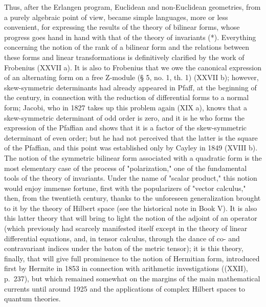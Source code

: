 Thus, after the Erlangen program, Euclidean and non-Euclidean geometries, from a purely algebraic point of view, became simple languages, more or less convenient, for expressing the results of the theory of bilinear forms, whose progress goes hand in hand with that of the theory of invariants (*). Everything concerning the notion of the rank of a bilinear form and the relations between these forms and linear transformations is definitively clarified by the work of Frobenius (XXVII a). It is also to Frobenius that we owe the canonical expression of an alternating form on a free Z-module (§ 5, no. 1, th. 1) (XXVII b); however, skew-symmetric determinants had already appeared in Pfaff, at the beginning of the century, in connection with the reduction of differential forms to a normal form; Jacobi, who in 1827 takes up this problem again (XIX a), knows that a skew-symmetric determinant of odd order is zero, and it is he who forms the expression of the Pfaffian and shows that it is a factor of the skew-symmetric determinant of even order; but he had not perceived that the latter is the square of the Pfaffian, and this point was established only by Cayley in 1849 (XVIII b). The notion of the symmetric bilinear form associated with a quadratic form is the most elementary case of the process of "polarization," one of the fundamental tools of the theory of invariants. Under the name of "scalar product," this notion would enjoy immense fortune, first with the popularizers of "vector calculus," then, from the twentieth century, thanks to the unforeseen generalization brought to it by the theory of Hilbert space (see the historical note in Book V). It is also this latter theory that will bring to light the notion of the adjoint of an operator (which previously had scarcely manifested itself except in the theory of linear differential equations, and, in tensor calculus, through the dance of co- and contravariant indices under the baton of the metric tensor); it is this theory, finally, that will give full prominence to the notion of Hermitian form, introduced first by Hermite in 1853 in connection with arithmetic investigations ((XXII), p.~237), but which remained somewhat on the margins of the main mathematical currents until around 1925 and the applications of complex Hilbert spaces to quantum theories.

